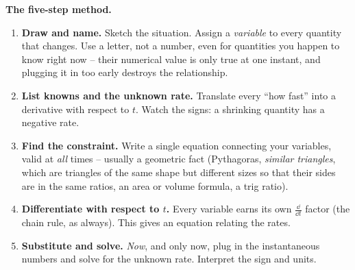 \begin{focusbox}
\textbf{The five-step method.}
\begin{enumerate}
\item \textbf{Draw and name.} Sketch the situation. Assign a \emph{variable} to every quantity that
changes. Use a letter, not a number, even for quantities you happen to know right now -- their
numerical value is only true at one instant, and plugging it in too early destroys the relationship.
\item \textbf{List knowns and the unknown rate.} Translate every ``how fast'' into a derivative with
respect to $t$. Watch the signs: a shrinking quantity has a negative rate.
\item \textbf{Find the constraint.} Write a single equation connecting your variables, valid at
\emph{all} times -- usually a geometric fact (Pythagoras, \emph{similar triangles}, which are
triangles of the same shape but different sizes so that their sides are in the same ratios, an area
or volume formula, a trig ratio).
\item \textbf{Differentiate with respect to $t$.} Every variable earns its own $\frac{\dd}{\dd t}$
factor (the chain rule, as always). This gives an equation relating the rates.
\item \textbf{Substitute and solve.} \emph{Now}, and only now, plug in the instantaneous numbers and
solve for the unknown rate. Interpret the sign and units.
\end{enumerate}
\end{focusbox}

